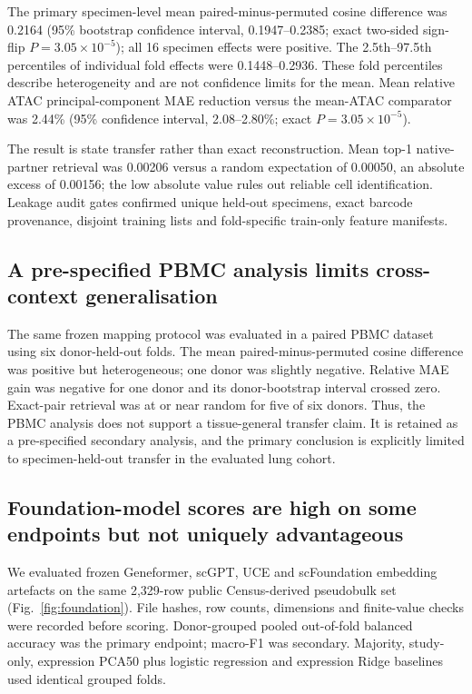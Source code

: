 \documentclass[11pt]{article}
\begin{document}
The primary specimen-level mean paired-minus-permuted cosine difference was 0.2164 (95\% bootstrap confidence interval, 0.1947--0.2385; exact two-sided sign-flip $P=3.05\times10^{-5}$); all 16 specimen effects were positive. The 2.5th--97.5th percentiles of individual fold effects were 0.1448--0.2936. These fold percentiles describe heterogeneity and are not confidence limits for the mean. Mean relative ATAC principal-component MAE reduction versus the mean-ATAC comparator was 2.44\% (95\% confidence interval, 2.08--2.80\%; exact $P=3.05\times10^{-5}$).

The result is state transfer rather than exact reconstruction. Mean top-1 native-partner retrieval was 0.00206 versus a random expectation of 0.00050, an absolute excess of 0.00156; the low absolute value rules out reliable cell identification. Leakage audit gates confirmed unique held-out specimens, exact barcode provenance, disjoint training lists and fold-specific train-only feature manifests.

\subsection*{A pre-specified PBMC analysis limits cross-context generalisation}

The same frozen mapping protocol was evaluated in a paired PBMC dataset using six donor-held-out folds. The mean paired-minus-permuted cosine difference was positive but heterogeneous; one donor was slightly negative. Relative MAE gain was negative for one donor and its donor-bootstrap interval crossed zero. Exact-pair retrieval was at or near random for five of six donors. Thus, the PBMC analysis does not support a tissue-general transfer claim. It is retained as a pre-specified secondary analysis, and the primary conclusion is explicitly limited to specimen-held-out transfer in the evaluated lung cohort.

\subsection*{Foundation-model scores are high on some endpoints but not uniquely advantageous}

We evaluated frozen Geneformer, scGPT, UCE and scFoundation embedding artefacts on the same 2,329-row public Census-derived pseudobulk set (Fig.~\ref{fig:foundation}). File hashes, row counts, dimensions and finite-value checks were recorded before scoring. Donor-grouped pooled out-of-fold balanced accuracy was the primary endpoint; macro-F1 was secondary. Majority, study-only, expression PCA50 plus logistic regression and expression Ridge baselines used identical grouped folds.
\end{document}
